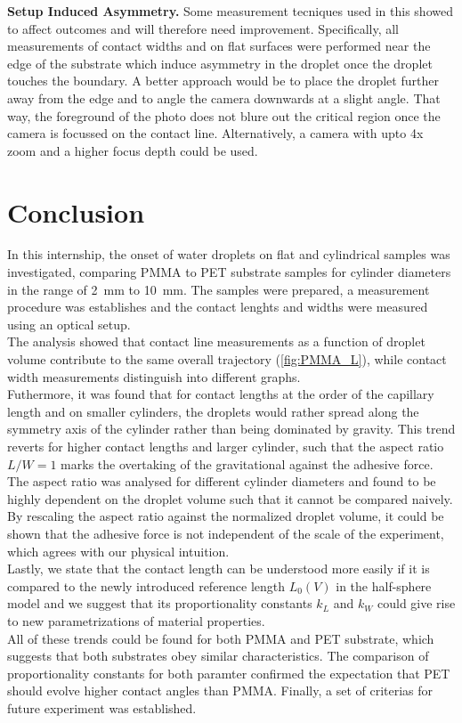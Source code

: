     \textbf{Setup Induced Asymmetry.} Some measurement tecniques used in this showed to affect outcomes and will therefore need improvement. Specifically, all measurements of contact widths and on flat surfaces were performed near the edge of the substrate which induce asymmetry in the droplet once the droplet touches the boundary. A better approach would be to place the droplet further away from the edge and to angle the camera downwards at a slight angle. That way, the foreground of the photo does not blure out the critical region once the camera is focussed on the contact line. Alternatively, a camera with upto 4x zoom and a higher focus depth could be used. 

\section{Conclusion}

    In this internship, the onset of water droplets on flat and cylindrical samples was investigated, comparing PMMA to PET substrate samples for cylinder diameters in the range of \SI{2}{\milli\meter} to \SI{10}{\milli\meter}. The samples were prepared, a measurement procedure was establishes and the contact lenghts and widths were measured using an optical setup. \\

    The analysis showed that contact line measurements as a function of droplet volume contribute to the same overall trajectory (\cref{fig:PMMA_L}), while contact width measurements distinguish into different graphs.\\ 
    
    Futhermore, it was found that for contact lengths at the order of the capillary length and on smaller cylinders, the droplets would rather spread along the symmetry axis of the cylinder rather than being dominated by gravity. This trend reverts for higher contact lengths and larger cylinder, such that the aspect ratio $L/W =1$ marks the overtaking of the gravitational against the adhesive force. \\
    
    The aspect ratio was analysed for different cylinder diameters and found to be highly dependent on the droplet volume such that it cannot be compared naively. By rescaling the aspect ratio against the normalized droplet volume, it could be shown that the adhesive force is not independent of the scale of the experiment, which agrees with our physical intuition. \\
    
    Lastly, we state that the contact length can be understood more easily if it is compared to the newly introduced reference length $L_0(V)$ in the half-sphere model and we suggest that its proportionality constants $k_L$ and $k_W$ could give rise to new parametrizations of material properties. \\

    All of these trends could be found for both PMMA and PET substrate, which suggests that both substrates obey similar characteristics. The comparison of proportionality constants for both paramter confirmed the expectation that PET should evolve higher contact angles than PMMA. Finally, a set of criterias for future experiment was established. 
